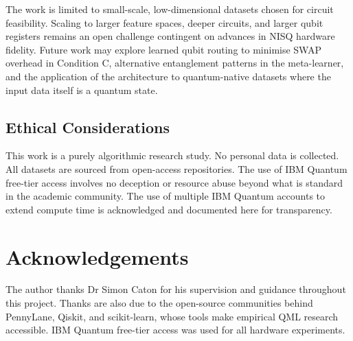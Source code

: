 \documentclass[]{UCD_CS_FYP_Report}
\begin{document}
The work is limited to small-scale, low-dimensional datasets chosen for circuit feasibility. Scaling to larger feature spaces, deeper circuits, and larger qubit registers remains an open challenge contingent on advances in NISQ hardware fidelity. Future work may explore learned qubit routing to minimise SWAP overhead in Condition C, alternative entanglement patterns in the meta-learner, and the application of the architecture to quantum-native datasets where the input data itself is a quantum state.

\section{Ethical Considerations}

This work is a purely algorithmic research study. No personal data is collected. All datasets are sourced from open-access repositories. The use of IBM Quantum free-tier access involves no deception or resource abuse beyond what is standard in the academic community. The use of multiple IBM Quantum accounts to extend compute time is acknowledged and documented here for transparency.


\chapter*{Acknowledgements}

The author thanks Dr Simon Caton for his supervision and guidance throughout this project. Thanks are also due to the open-source communities behind PennyLane, Qiskit, and scikit-learn, whose tools make empirical QML research accessible. IBM Quantum free-tier access was used for all hardware experiments.

\printbibliography
\end{document}
